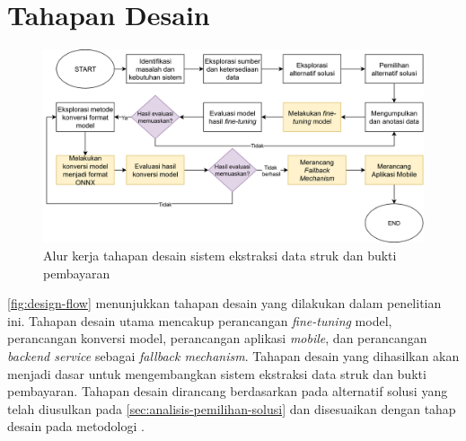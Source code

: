 \section{Tahapan Desain}
\label{sec:tahapan-desain}
\begin{figure}[htbp]
    \centering
    \includegraphics[width=\textwidth]{images/design-flow.png}
    \caption{Alur kerja tahapan desain sistem ekstraksi data struk dan bukti pembayaran}
    \label{fig:design-flow}
\end{figure}

\autoref{fig:design-flow} menunjukkan tahapan desain yang dilakukan dalam penelitian ini. Tahapan desain utama mencakup perancangan \emph{fine-tuning} model, perancangan konversi model, perancangan aplikasi \emph{mobile}, dan perancangan \emph{backend service} sebagai \emph{fallback mechanism}. Tahapan desain yang dihasilkan akan menjadi dasar untuk mengembangkan sistem ekstraksi data struk dan bukti pembayaran. Tahapan desain dirancang berdasarkan pada alternatif solusi yang telah diusulkan pada \autoref{sec:analisis-pemilihan-solusi} dan disesuaikan dengan tahap desain pada metodologi \dsrm.







   



